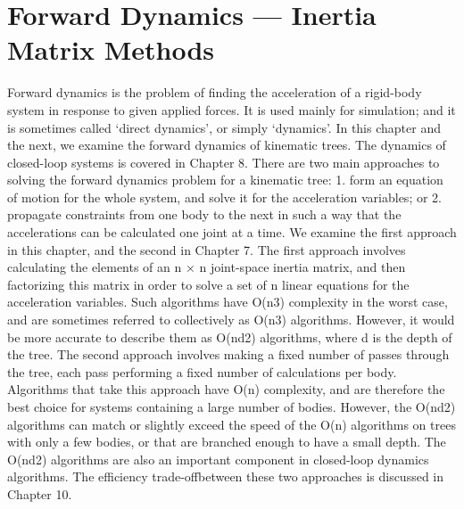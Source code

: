 \chapter{Forward Dynamics --- Inertia Matrix Methods}
\label{chap:6}
Forward dynamics is the problem of finding the acceleration of a rigid-body system in response to given applied forces. It is used mainly for simulation; and it is sometimes called ‘direct dynamics’, or simply ‘dynamics’. In this chapter and the next, we examine the forward dynamics of kinematic trees. The dynamics of closed-loop systems is covered in Chapter 8. There are two main approaches to solving the forward dynamics problem for a kinematic tree: 1. form an equation of motion for the whole system, and solve it for the acceleration variables; or 2. propagate constraints from one body to the next in such a way that the accelerations can be calculated one joint at a time. We examine the first approach in this chapter, and the second in Chapter 7. The first approach involves calculating the elements of an n × n joint-space inertia matrix, and then factorizing this matrix in order to solve a set of n linear equations for the acceleration variables. Such algorithms have O(n3) complexity in the worst case, and are sometimes referred to collectively as O(n3) algorithms. However, it would be more accurate to describe them as O(nd2) algorithms, where d is the depth of the tree. The second approach involves making a fixed number of passes through the tree, each pass performing a fixed number of calculations per body. Algorithms that take this approach have O(n) complexity, and are therefore the best choice for systems containing a large number of bodies. However, the O(nd2) algorithms can match or slightly exceed the speed of the O(n) algorithms on trees with only a few bodies, or that are branched enough to have a small depth. The O(nd2) algorithms are also an important component in closed-loop dynamics algorithms. The efficiency trade-offbetween these two approaches is discussed in Chapter 10.

